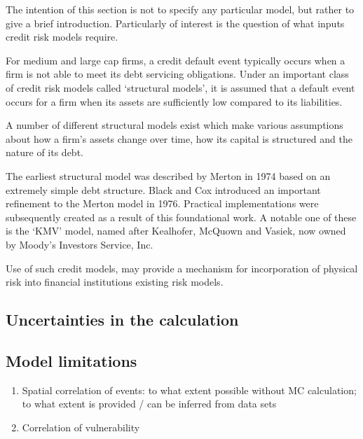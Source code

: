 \documentclass[a4paper,11pt]{extarticle} %
\begin{document}
The intention of this section is not to specify any particular model, but rather to give a brief introduction. Particularly of interest is the question of what inputs credit risk models require.

For medium and large cap firms, a credit default event typically occurs when a firm is not able to meet its debt servicing obligations. Under an important class of credit risk models called `structural models', it is assumed that a default event occurs for a firm when its assets are sufficiently low compared to its liabilities. 

A number of different structural models exist which make various assumptions about how a firm's assets change over time, how its capital is structured and the nature of its debt. 

The earliest structural model was described by Merton in 1974 \cite{Merton:1974} based on an extremely simple debt structure. Black and Cox \cite{BlackCox:1976} introduced an important refinement to the Merton model in 1976. Practical implementations were subsequently created as a result of this foundational work. A notable one of these is the `KMV' model, named after Kealhofer, McQuown and Vasiek, now owned by Moody's Investors Service, Inc.  

Use of such credit models, may provide a mechanism for incorporation of physical risk into financial institutions existing risk models\cite{KenyonEtAl:2021}. 

\subsection{Uncertainties in the calculation}

\subsection{Model limitations}

\begin{enumerate}
	\item Spatial correlation of events: to what extent possible without MC calculation; to what extent is provided / can be inferred from data sets
	\item Correlation of vulnerability
\end{enumerate}






\clearpage


%

%
\end{document}
